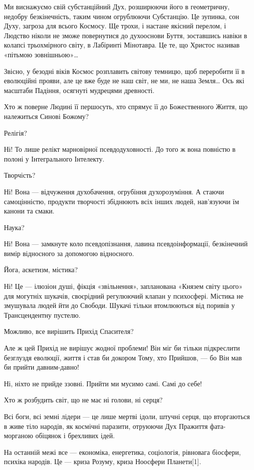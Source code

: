 Ми виснажуємо свій субстанційний Дух, розширюючи його в геометричну, недобру
безкінечність, таким чином огрублюючи Субстанцію. Це зупинка, сон Духу, загроза
для всього Космосу. Ще трохи, і настане якісний перелом, і Людство ніколи не
зможе повернутися до духооснови Буття, зоставшись навіки в колапсі трьохмірного
світу, в Лабіринті Мінотавра. Це те, що Христос називав «пітьмою зовнішньою»…

Звісно, у безодні віків Космос розплавить світову темницю, щоб переробити її в
еволюційні прояви, але це вже буде не наш світ, не ми, не наша Земля… Ось які
масштаби Падіння, осягнуті мудрецями древності.

Хто ж поверне Людині її першосуть, хто спрямує її до Божественного Життя, що
належиться Синові Божому?

Релігія?

Ні! То лише релікт марновірної псевдодуховності. До того ж вона повністю в
полоні у Інтегрального Інтелекту.

Творчість?

Ні! Вона — відчуження духобачення, огрубіння духорозуміння. А стаючи
самоцінністю, продукти творчості збіднюють всіх інших людей, нав’язуючи їм
канони та смаки.

Наука?

Ні! Вона — замкнуте коло псевдопізнання, лавина псевдоінформації, безкінечний
вимір відносного за допомогою відносного.

Йога, аскетизм, містика?

Ні! Це — ілюзіон душі, фікція «звільнення», запланована «Князем світу цього»
для могутніх шукачів, своєрідний регулюючий клапан у психосфері. Містика не
змушувала людей йти до Свободи. Шукачі тільки втомлюються від поривів у
Трансцендентну пустелю.

Можливо, все вирішить Прихід Спасителя?

Але ж цей Прихід не вирішує жодної проблеми! Він міг би тільки підкреслити
безглуздя еволюції, життя і став би докором Тому, хто Прийшов, — бо Він мав би
прийти давним-давно!

Ні, ніхто не прийде ззовні. Прийти ми мусимо самі. Самі до себе!

Хто ж розбудить світ, що не має ні голови, ні серця?

Всі боги, всі земні лідери — це лише мертві ідоли, штучні серця, що вторгаються
в живе тіло народів, як космічні паразити, отруюючи Дух Пражиття фата-морганою
обіцянок і брехливих ідей.

На останній межі все — економіка, енергетика, соціологія, рівновага біосфери,
психіка народів. Це — криза Розуму, криза Ноосфери Планети[1].


